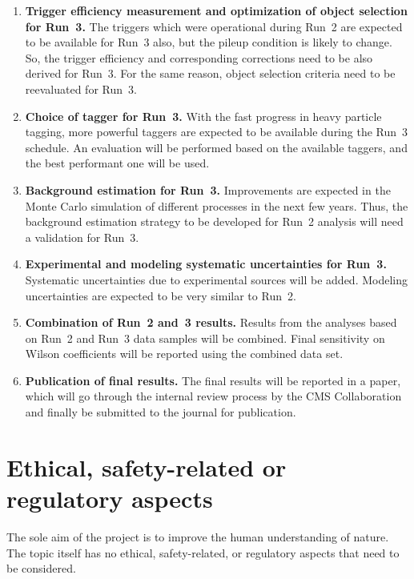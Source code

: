 \documentclass[a4paper,11pt]{article}
\begin{document}
\begin{enumerate}[noitemsep,topsep=0pt]
\item {\bf Trigger efficiency measurement and optimization of object selection for Run~3.} The triggers which were operational during Run~2 are expected to be available for Run~3 also, but the pileup condition is likely to change. So, the trigger efficiency and corresponding corrections need to be also derived for Run~3. 
For the same reason, object selection criteria need to be reevaluated for Run~3. 

\item {\bf Choice of \PH tagger for Run~3.} With the fast progress in heavy particle tagging, more powerful taggers are expected to be available during the Run~3 schedule. An evaluation will be performed based on the available taggers, and the best performant one will be used. 

\item {\bf Background estimation for Run~3.} Improvements are expected in the Monte Carlo simulation of different processes in the next few years. Thus, the background estimation strategy to be developed for Run~2 analysis will need a validation for Run~3.

\item {\bf Experimental and modeling systematic uncertainties for Run~3.} Systematic uncertainties due to experimental sources will be added. Modeling uncertainties are expected to be very similar to Run~2.

\item {\bf Combination of Run~2 and~3 results.} Results from the analyses based on Run~2 and Run~3 data samples will be combined. Final sensitivity on Wilson coefficients will be reported using the combined data set. 

\item {\bf Publication of final results.} The final results will be reported in a paper, which will go through the internal review process by the CMS Collaboration and finally be submitted to the journal for publication. 

\end{enumerate}


\section{Ethical, safety-related or regulatory aspects}

The sole aim of the project is to improve the human understanding of nature. 
The topic itself has no ethical, safety-related, or regulatory aspects that need to be considered.
\end{document}
